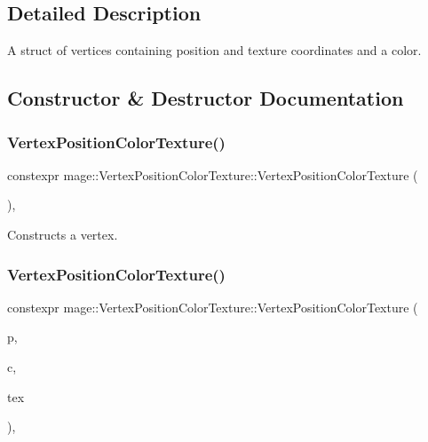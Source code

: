 \subsection{Detailed Description}
A struct of vertices containing position and texture coordinates and a color. 

\subsection{Constructor \& Destructor Documentation}
\hypertarget{structmage_1_1_vertex_position_color_texture_a435db808d87294838ec008221970ea61}{}\label{structmage_1_1_vertex_position_color_texture_a435db808d87294838ec008221970ea61} 
\subsubsection{\texorpdfstring{Vertex\+Position\+Color\+Texture()}{VertexPositionColorTexture()}\hspace{0.1cm}{\footnotesize\ttfamily [1/4]}}
{\footnotesize\ttfamily constexpr mage\+::\+Vertex\+Position\+Color\+Texture\+::\+Vertex\+Position\+Color\+Texture (\begin{DoxyParamCaption}{ }\end{DoxyParamCaption})\hspace{0.3cm}{\ttfamily [default]}, {\ttfamily [noexcept]}}

Constructs a vertex. \hypertarget{structmage_1_1_vertex_position_color_texture_a95ed2d8086958400101221c93c11e57a}{}\label{structmage_1_1_vertex_position_color_texture_a95ed2d8086958400101221c93c11e57a} 
\subsubsection{\texorpdfstring{Vertex\+Position\+Color\+Texture()}{VertexPositionColorTexture()}\hspace{0.1cm}{\footnotesize\ttfamily [2/4]}}
{\footnotesize\ttfamily constexpr mage\+::\+Vertex\+Position\+Color\+Texture\+::\+Vertex\+Position\+Color\+Texture (\begin{DoxyParamCaption}\item[{const \hyperlink{structmage_1_1_point3}{Point3} \&}]{p,  }\item[{const \hyperlink{structmage_1_1_s_r_g_b_a}{S\+R\+G\+BA} \&}]{c,  }\item[{const \hyperlink{structmage_1_1_u_v}{UV} \&}]{tex }\end{DoxyParamCaption})\hspace{0.3cm}{\ttfamily [explicit]}, {\ttfamily [noexcept]}}


